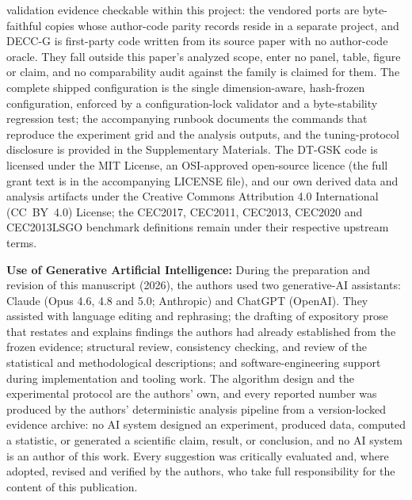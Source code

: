 \documentclass[10pt,a4paper]{article}
\newcommand{\dtgsk}{DT-GSK}
\begin{document}
validation evidence checkable within this project: the vendored ports
are byte-faithful copies whose author-code parity records reside in a
separate project, and DECC-G is first-party code written from its source
paper with no author-code oracle. They fall outside this paper's
analyzed scope, enter no panel, table, figure or claim, and no
comparability audit against the family is claimed for
them. 
The complete shipped configuration is the single dimension-aware,
hash-frozen configuration, enforced by a configuration-lock validator
and a byte-stability regression test; the accompanying runbook
documents the commands that reproduce the
experiment grid and the analysis outputs, and the tuning-protocol
disclosure is provided in the Supplementary
Materials. The \dtgsk{} code is licensed under the MIT License, an
OSI-approved open-source licence (the full grant text is in the
accompanying LICENSE file), and our own derived data and
analysis artifacts under the Creative Commons Attribution 4.0 International
(CC~BY~4.0) License; the CEC2017, CEC2011, CEC2013, CEC2020 and
CEC2013LSGO benchmark definitions remain
under their respective upstream terms. 























\vspace{1em}
\noindent\textbf{Use of Generative Artificial Intelligence:}\quad
During the preparation and revision of this manuscript (2026), the authors used
two generative-AI assistants: Claude (Opus 4.6, 4.8 and 5.0; Anthropic) and
ChatGPT (OpenAI). They assisted with language editing and rephrasing; the
drafting of expository prose that restates and explains findings the authors had
already established from the frozen evidence; structural review, consistency
checking, and review of the statistical and methodological descriptions; and
software-engineering support during implementation and tooling work. The
algorithm design and the experimental protocol are the authors' own, and every
reported number was produced by the authors' deterministic analysis pipeline
from a version-locked evidence archive: no AI system designed an experiment,
produced data, computed a statistic, or generated a scientific claim, result, or
conclusion, and no AI system is an author of this work. Every suggestion was
critically evaluated and, where adopted, revised and verified by the authors,
who take full responsibility for the content of this publication.
\end{document}
